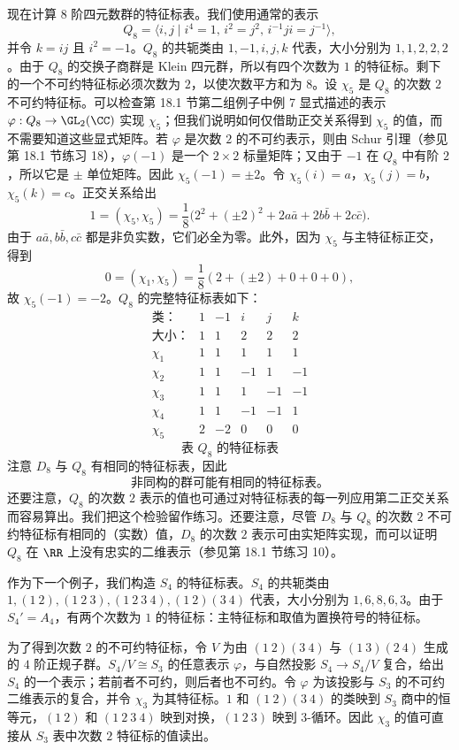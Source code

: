 现在计算 $8$ 阶四元数群的特征标表。我们使用通常的表示
\[
  Q_8=\langle i,j\mid i^4=1,\, i^2=j^2,\, i^{-1}ji=j^{-1}\rangle,
\]
并令 $k=ij$ 且 $i^2=-1$。$Q_8$ 的共轭类由 $1,-1,i,j,k$ 代表，大小分别为 $1,1,2,2,2$。由于 $Q_8$ 的交换子商群是 Klein 四元群，所以有四个次数为 $1$ 的特征标。剩下的一个不可约特征标必须次数为 $2$，以使次数平方和为 $8$。设 $\chi_5$ 是 $Q_8$ 的次数 $2$ 不可约特征标。可以检查第 18.1 节第二组例子中例 7 显式描述的表示 $\varphi:Q_8\to\GL_2(\CC)$ 实现 $\chi_5$；但我们说明如何仅借助正交关系得到 $\chi_5$ 的值，而不需要知道这些显式矩阵。若 $\varphi$ 是次数 $2$ 的不可约表示，则由 Schur 引理（参见第 18.1 节练习 18），$\varphi(-1)$ 是一个 $2\times2$ 标量矩阵；又由于 $-1$ 在 $Q_8$ 中有阶 $2$，所以它是 $\pm$ 单位矩阵。因此 $\chi_5(-1)=\pm2$。令 $\chi_5(i)=a$，$\chi_5(j)=b$，$\chi_5(k)=c$。正交关系给出
\[
  1=(\chi_5,\chi_5)=\frac18\bigl(2^2+(\pm2)^2+2a\bar a+2b\bar b+2c\bar c\bigr).
\]
由于 $a\bar a,b\bar b,c\bar c$ 都是非负实数，它们必全为零。此外，因为 $\chi_5$ 与主特征标正交，得到
\[
  0=(\chi_1,\chi_5)=\frac18(2+(\pm2)+0+0+0),
\]
故 $\chi_5(-1)=-2$。$Q_8$ 的完整特征标表如下：
\[
\begin{array}{c|ccccc}
\text{类：} & 1 & -1 & i & j & k\\
\text{大小：} & 1 & 1 & 2 & 2 & 2\\\hline
\chi_1 & 1 & 1 & 1 & 1 & 1\\
\chi_2 & 1 & 1 & -1 & 1 & -1\\
\chi_3 & 1 & 1 & 1 & -1 & -1\\
\chi_4 & 1 & 1 & -1 & -1 & 1\\
\chi_5 & 2 & -2 & 0 & 0 & 0
\end{array}
\]
\[
\text{表 }Q_8\text{ 的特征标表}
\]
注意 $D_8$ 与 $Q_8$ 有相同的特征标表，因此
\[
  \text{非同构的群可能有相同的特征标表。}
\]
还要注意，$Q_8$ 的次数 $2$ 表示的值也可通过对特征标表的每一列应用第二正交关系而容易算出。我们把这个检验留作练习。还要注意，尽管 $D_8$ 与 $Q_8$ 的次数 $2$ 不可约特征标有相同的（实数）值，$D_8$ 的次数 $2$ 表示可由实矩阵实现，而可以证明 $Q_8$ 在 $\RR$ 上没有忠实的二维表示（参见第 18.1 节练习 10）。

作为下一个例子，我们构造 $S_4$ 的特征标表。$S_4$ 的共轭类由 $1,(1\ 2),(1\ 2\ 3),(1\ 2\ 3\ 4),(1\ 2)(3\ 4)$ 代表，大小分别为 $1,6,8,6,3$。由于 $S_4'=A_4$，有两个次数为 $1$ 的特征标：主特征标和取值为置换符号的特征标。

为了得到次数 $2$ 的不可约特征标，令 $V$ 为由 $(1\ 2)(3\ 4)$ 与 $(1\ 3)(2\ 4)$ 生成的 $4$ 阶正规子群。$S_4/V\cong S_3$ 的任意表示 $\varphi$，与自然投影 $S_4\to S_4/V$ 复合，给出 $S_4$ 的一个表示；若前者不可约，则后者也不可约。令 $\varphi$ 为该投影与 $S_3$ 的不可约二维表示的复合，并令 $\chi_3$ 为其特征标。$1$ 和 $(1\ 2)(3\ 4)$ 的类映到 $S_3$ 商中的恒等元，$(1\ 2)$ 和 $(1\ 2\ 3\ 4)$ 映到对换，$(1\ 2\ 3)$ 映到 $3$-循环。因此 $\chi_3$ 的值可直接从 $S_3$ 表中次数 $2$ 特征标的值读出。

